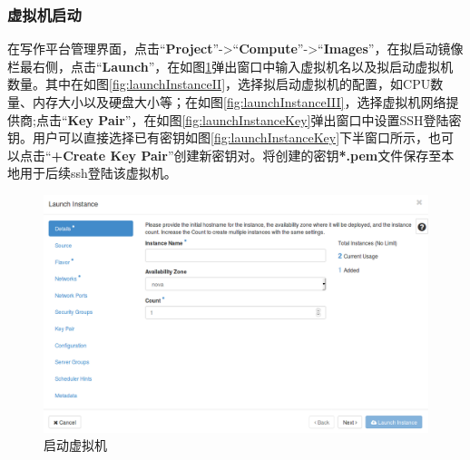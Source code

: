\documentclass[12pt]{ctexart}%
\begin{document}
\subsubsection{虚拟机启动}
在写作平台管理界面，点击``\textbf{Project}''->``\textbf{Compute}''->``\textbf{Images}''，在拟启动镜像栏最右侧，点击``\textbf{Launch}''，在如图\ref{fig:launchInstance}弹出窗口中输入虚拟机名以及拟启动虚拟机数量。其中在如图\ref{fig:launchInstanceII}，选择拟启动虚拟机的配置，如CPU数量、内存大小以及硬盘大小等；在如图\ref{fig:launchInstanceIII}，选择虚拟机网络提供商;点击``\textbf{Key Pair}''，在如图\ref{fig:launchInstanceKey}弹出窗口中设置SSH登陆密钥。用户可以直接选择已有密钥如图\ref{fig:launchInstanceKey}下半窗口所示，也可以点击``\textbf{+Create Key Pair}''创建新密钥对。将创建的密钥\textbf{*.pem}文件保存至本地用于后续ssh登陆该虚拟机。
\begin{figure}[!htb]
\centering
\includegraphics[width=6in]{./figures/LaunchInstance}
\caption{启动虚拟机}
\label{fig:launchInstance}
\end{figure}
\end{document}
